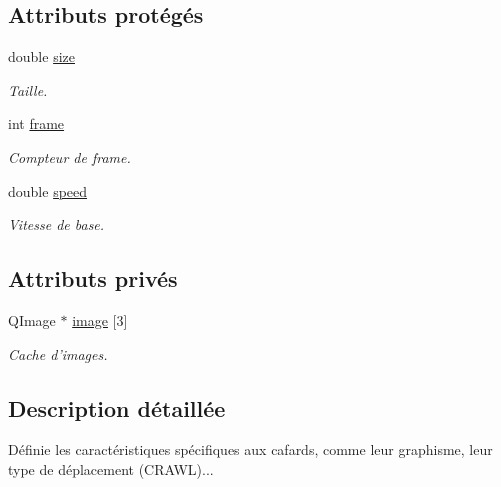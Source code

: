 \subsection*{Attributs protégés}
\begin{DoxyCompactItemize}
\item 
double \hyperlink{classBug_a27a0f0b84d15525e409955509e6e3c42}{size}
\begin{DoxyCompactList}\small\item\em Taille. \end{DoxyCompactList}\item 
int \hyperlink{classBug_ad7e3597cf049f1051be94fcaf2fd3598}{frame}
\begin{DoxyCompactList}\small\item\em Compteur de frame. \end{DoxyCompactList}\item 
double \hyperlink{classBug_a13b95fbf23748ea853b01bfd0b0e7fc8}{speed}
\begin{DoxyCompactList}\small\item\em Vitesse de base. \end{DoxyCompactList}\end{DoxyCompactItemize}
\subsection*{Attributs privés}
\begin{DoxyCompactItemize}
\item 
QImage $\ast$ \hyperlink{classRoach_afe6b72503197eb2bacafda9df317b96f}{image} \mbox{[}3\mbox{]}
\begin{DoxyCompactList}\small\item\em Cache d'images. \end{DoxyCompactList}\end{DoxyCompactItemize}


\subsection{Description détaillée}
Définie les caractéristiques spécifiques aux cafards, comme leur graphisme, leur type de déplacement (CRAWL)... 


